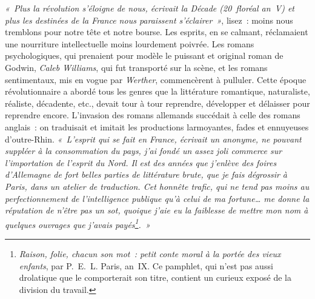 \documentclass[french,twoside]{book} %
\begin{document}
\emph{« Plus la révolution s’éloigne de nous, écrivait la \emph{Décade} (20 floréal an V) et plus les destinées de la France nous paraissent s’éclairer »}, lisez : moins nous tremblons pour notre tête et notre bourse. Les esprits, en se calmant, réclamaient une nourriture intellectuelle moins lourdement poivrée. Les romans psychologiques, qui prenaient pour modèle le puissant et original roman de Godwin, \emph{Caleb Williams}, qui fut transporté sur la scène, et les romans sentimentaux, mis en vogue par \emph{Werther}, commencèrent à pulluler. Cette époque révolutionnaire a abordé tous les genres que la littérature romantique, naturaliste, réaliste, décadente, etc., devait tour à tour reprendre, développer et délaisser pour reprendre encore. L’invasion des romans allemands succédait à celle des romans anglais : on traduisait et imitait les productions larmoyantes, fades et ennuyeuses d’outre-Rhin. \emph{« L’esprit qui se fait en France, écrivait un anonyme, ne pouvant suppléer à la consommation du pays, j’ai fondé un assez joli commerce sur l’importation de l’esprit du Nord. Il est des années que j’enlève des foires d’Allemagne de fort belles parties de littérature brute, que je fais dégrossir à Paris, dans un atelier de traduction. Cet honnête trafic, qui ne tend pas moins au perfectionnement de l’intelligence publique qu’à celui  
\label{p591}de ma fortune… me donne la réputation de n’être pas un sot, quoique j’aie eu la faiblesse de mettre mon nom à quelques ouvrages que j’avais payés\footnote{\emph{Raison, folie, chacun son mot : petit conte moral à la portée des vieux enfants}, par P. E. L. Paris, an IX. Ce pamphlet, qui n’est pas aussi drolatique que le comporterait son titre, contient un curieux exposé de la division du travail.}. »}\par
\end{document}
